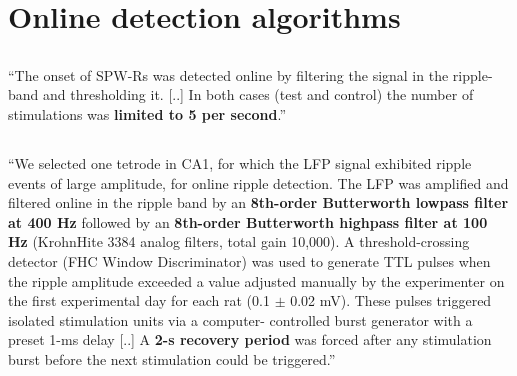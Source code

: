 \clearpage
\section{Online detection algorithms}
\label{apx:online-SWR-detection-literature}



\subsection{}

``The onset of SPW-Rs was detected online by filtering the signal in the ripple-band and thresholding it. [..] In both cases (test and control) the number of stimulations was \textbf{limited to 5 per second}.'' \cite{Girardeau2009}


\subsection{}

``We selected one tetrode in CA1, for which the LFP signal exhibited ripple events of large amplitude, for online ripple detection. The LFP was amplified and filtered online in the ripple band by an \textbf{8th-order Butterworth lowpass filter at 400 Hz} followed by an \textbf{8th-order Butterworth highpass filter at 100 Hz} (KrohnHite 3384 analog filters, total gain 10,000). A threshold-crossing detector (FHC Window Discriminator) was used to generate TTL pulses when the ripple amplitude exceeded a value adjusted manually by the experimenter on the first experimental day for each rat (0.1 $\pm$ 0.02 mV). These pulses triggered isolated stimulation units via a computer- controlled burst generator with a preset 1-ms delay [..] A \textbf{2-s recovery period} was forced after any stimulation burst before the next stimulation could be triggered.'' \cite{Ego-Stengel2009}

\begin{figure}
\end{figure}


\subsection{}

